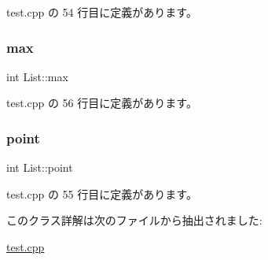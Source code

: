  test.\+cpp の 54 行目に定義があります。

\mbox{\label{class_list_a73fc93ef327ff5f4bb35fd628b658d50}} 
\subsubsection{\texorpdfstring{max}{max}}
{\footnotesize\ttfamily int List\+::max\hspace{0.3cm}{\ttfamily [private]}}



 test.\+cpp の 56 行目に定義があります。

\mbox{\label{class_list_ab03801c8c3765b381b45a306d34f5daa}} 
\subsubsection{\texorpdfstring{point}{point}}
{\footnotesize\ttfamily int List\+::point\hspace{0.3cm}{\ttfamily [private]}}



 test.\+cpp の 55 行目に定義があります。



このクラス詳解は次のファイルから抽出されました\+:\begin{DoxyCompactItemize}
\item 
\hyperlink{test_8cpp}{test.\+cpp}\end{DoxyCompactItemize}
